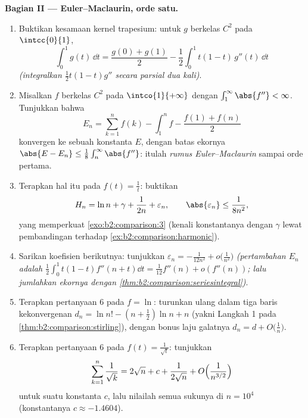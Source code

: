 \begin{problem}
\medskip
\noindent\textbf{Bagian II --- Euler--Maclaurin, orde satu.}
\begin{enumerate}[resume]
  \item Buktikan kesamaan kernel trapesium: untuk $g$ berkelas
        $C^2$ pada $\intcc{0}{1}$,
        \[
        \int_0^1 g(t)\,\dd t = \frac{g(0) + g(1)}{2}
        - \frac12\int_0^1 t(1 - t)\,g''(t)\,\dd t
        \]
        \emph{(integralkan $\frac12 t(1-t)g''$ secara parsial dua kali)}.
  \item Misalkan $f$ berkelas $C^2$ pada $\intco{1}{+\infty}$ dengan
        $\int_1^\infty \abs{f''} < \infty$. Tunjukkan bahwa
        \[
        E_n = \sum_{k=1}^{n} f(k) - \int_1^n f -
        \frac{f(1) + f(n)}{2}
        \]
        konvergen ke sebuah konstanta $E$, dengan batas ekornya
        $\abs{E - E_n} \leq \frac18\int_n^\infty\abs{f''}$: itulah
        \emph{rumus Euler--Maclaurin} sampai orde pertama.
  \item Terapkan hal itu pada $f(t) = \frac1t$: buktikan
        \[
        H_n = \ln n + \gamma + \frac{1}{2n} + \varepsilon_n,
        \qquad \abs{\varepsilon_n} \leq \frac{1}{8n^2},
        \]
        yang memperkuat \cref{exo:b2:comparison:3} (kenali
        konstantanya dengan $\gamma$ lewat pembandingan terhadap
        \cref{ex:b2:comparison:harmonic}).
  \item Sarikan koefisien berikutnya: tunjukkan $\varepsilon_n =
        -\frac{1}{12n^2} + o\bigl(\frac1{n^2}\bigr)$
        \emph{(pertambahan $E_n$ adalah
        $\frac12\int_0^1t(1-t)f''(n+t)\dd t =
        \frac1{12}f''(n) + o(f''(n))$; lalu jumlahkan ekornya dengan
        \cref{thm:b2:comparison:seriesintegral})}.
  \item Terapkan pertanyaan 6 pada $f = \ln$: turunkan ulang dalam tiga
        baris kekonvergenan $d_n = \ln n! - (n +
        \frac12)\ln n + n$ (yakni Langkah 1 pada
        \cref{thm:b2:comparison:stirling}),  dengan bonus laju
        galatnya $d_n = d + O\bigl(\frac1n\bigr)$.
  \item Terapkan pertanyaan 6 pada $f(t) = \frac{1}{\sqrt t}$: tunjukkan
        \[
        \sum_{k=1}^{n}\frac1{\sqrt k} = 2\sqrt n + c +
        \frac{1}{2\sqrt n} + O\Bigl(\frac{1}{n^{3/2}}\Bigr)
        \]
        untuk suatu konstanta $c$, lalu nilailah semua sukunya di $n =
        10^4$ (konstantanya $c \approx -1.4604$).
\end{enumerate}


\end{problem}
